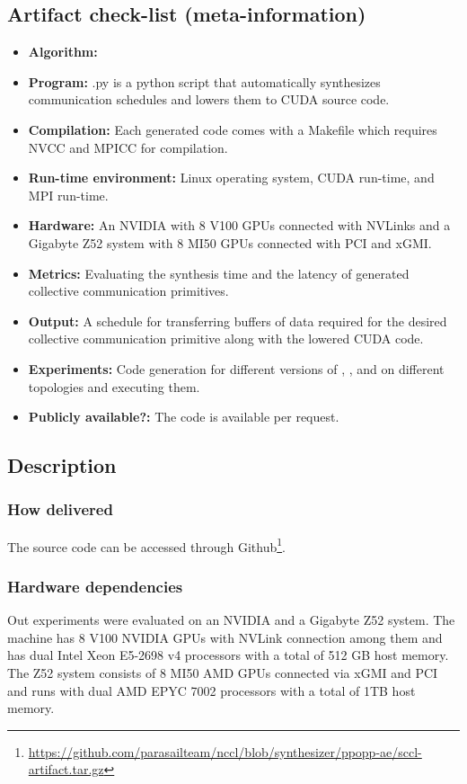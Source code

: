 \subsection{Artifact check-list (meta-information)}
{\small
\begin{itemize}
\item {\bf Algorithm: } \tool
\item {\bf Program: } \MakeLowercase{\tool.py} is a python script that automatically synthesizes communication schedules and
	lowers them to CUDA source code.
\item {\bf Compilation: } Each generated code comes with a Makefile which requires NVCC and 
	MPICC for compilation.
\item {\bf Run-time environment: } Linux operating system, CUDA run-time, and MPI run-time.
\item {\bf Hardware: } An NVIDIA \dgxone with 8 V100 GPUs connected with NVLinks and a 
	Gigabyte Z52 system with 8 MI50 GPUs connected with PCI and xGMI.
\item {\bf Metrics: } Evaluating the synthesis time and the latency of generated collective 
	communication primitives.
\item {\bf Output: } A schedule for transferring buffers of data required for the desired collective communication
	primitive along with the lowered CUDA code.
\item {\bf Experiments: } Code generation for different versions of 
	\allreduce, \allgather, and \alltoall on different topologies and executing them.
\item {\bf Publicly available?: } The code is available per request.
\end{itemize}

\subsection{Description}
\subsubsection{How delivered}
The source code can be accessed through Github\footnote{\url{https://github.com/parasailteam/nccl/blob/synthesizer/ppopp-ae/sccl-artifact.tar.gz}}.

\subsubsection{Hardware dependencies}
Out experiments were evaluated on an NVIDIA \dgxone and a Gigabyte Z52 system. The \dgxone machine
has 8 V100 NVIDIA GPUs with NVLink connection among them and has dual Intel Xeon E5-2698 v4 processors with a total of 512 GB host memory. 
The Z52 system consists of 8 MI50 AMD GPUs connected via xGMI and PCI and runs with dual AMD EPYC 7002 processors with a total of
1TB host memory.

}
